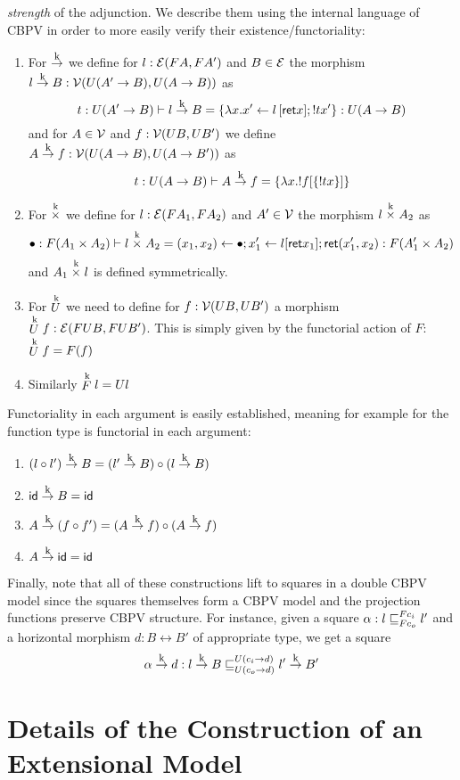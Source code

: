 \emph{strength} of the adjunction. We describe them using the internal
language of CBPV in order to more easily verify their
existence/functoriality:
\begin{enumerate}
\item For $\tok$ we define for $l : \calE(F A,F A')$ and $B \in \calE$ the morphism $l \tok B : \calV(U(A' \to B),U(A\to B))$ as
  \[ t:U(A'\to B) \vdash l \tok B = \{ \lambda x. x' \leftarrow l\,[\ret x]; ! t x'\} : U(A \to B) \]
  and for $A \in \calV$ and $f : \calV(UB,UB')$ we define $A \tok f : \calV(U(A \to B),U(A\to B'))$ as
  \[ t : U(A \to B) \vdash A \tok f = \{ \lambda x. !f[\{ ! t x \}]\} \]
\item For $\timesk$ we define for $l : \calE(F A_1,FA_2)$ and $A' \in \calV$ the morphism $l \timesk A_2$ as
  \[ \bullet : F(A_1\times A_2) \vdash l \timesk A_2 = (x_1,x_2) \leftarrow \bullet; x_1' \leftarrow l[\ret x_1]; \ret (x_1',x_2) : F(A_1'\times A_2)\]
  and $A_1 \timesk l$ is defined symmetrically.
\item For $\Uk$ we need to define for $f : \calV(UB,UB')$ a morphism $\Uk f : \calE(FUB,FUB')$. This is simply given by the functorial action of $F$: $\Uk f = F(f)$
\item Similarly $\Fk l = Ul$
\end{enumerate}

Functoriality in each argument is easily established, meaning for
example for the function type is functorial in each argument:
\begin{enumerate}
\item $(l \circ l') \tok B = (l' \tok B) \circ (l \tok B)$
\item $\id \tok B = \id$
\item $A \tok (f \circ f') = (A \tok f) \circ (A \tok f)$
\item $A \tok \id = \id$
\end{enumerate}

Finally, note that all of these constructions lift to squares in a
double CBPV model since the squares themselves form a CBPV model and
the projection functions preserve CBPV structure. For instance, given a square
$\alpha : l \ltdyn_{F c_o}^{F c_i} l'$ and a horizontal morphism $d : B \rel B'$ of appropriate type, we get a square
\[ \alpha \tok d : l \tok B \ltdyn_{U(c_o \to d)}^{U(c_i \to d)} l' \tok B' \]

\section{Details of the Construction of an Extensional Model}

